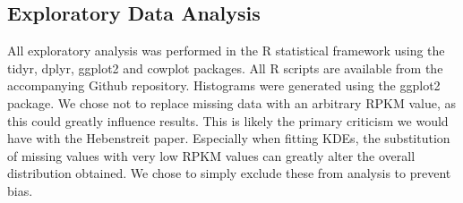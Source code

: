 \documentclass[12pt]{report}
\begin{document}




\subsection*{Exploratory Data Analysis}
All exploratory analysis was performed in the R statistical framework using the tidyr, dplyr, ggplot2 and cowplot packages.
All R scripts are available from the accompanying Github repository. Histograms were generated using the ggplot2
package. We chose not to replace missing data with an arbitrary RPKM value, as this could greatly influence results. This is likely the primary criticism we
would have with the Hebenstreit paper. Especially when fitting KDEs, the substitution of missing values with very low RPKM values can greatly
alter the overall distribution obtained. We chose to simply exclude these from analysis to prevent bias.
\end{document}
